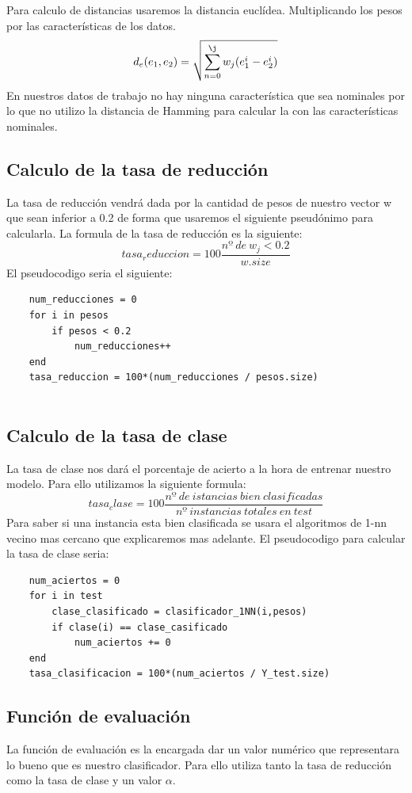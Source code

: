 \documentclass[titlepage]{article}
\begin{document}
	Para calculo de distancias usaremos la distancia euclídea. Multiplicando los pesos por las características de los datos.
	$$
		d_e(e_1,e_2) = \sqrt{\sum_{n=0}^{\j} w_j(e_1^i-e_2^i)}
	$$
	En nuestros datos de trabajo no hay ninguna característica que sea nominales por lo que no utilizo la distancia de Hamming para calcular la con las características nominales. 
	\newpage
	\subsection{Calculo de la tasa de reducción}
	La tasa de reducción vendrá dada por la cantidad de pesos de nuestro vector w que sean inferior a 0.2 de forma que usaremos el siguiente pseudónimo para calcularla.
	La formula de la tasa de reducción es la siguiente:
	$$
		tasa_reduccion = 100 \frac{nº\ de\ w_j < 0.2}{w.size}
	$$
	El pseudocodigo seria el siguiente:
	\begin{lstlisting}
	num_reducciones = 0
	for i in pesos
		if pesos < 0.2
			num_reducciones++
	end
	tasa_reduccion = 100*(num_reducciones / pesos.size)
	
	\end{lstlisting}
	
	\subsection{Calculo de la tasa de clase}
	La tasa de clase nos dará el porcentaje de acierto a la hora de entrenar nuestro modelo. Para ello utilizamos la siguiente formula:
	$$
	tasa_clase = 100 \frac{nº\ de\ istancias\ bien\ clasificadas}{nº\ instancias\ totales\ en\ test}
	$$
	Para saber si una instancia esta bien clasificada se usara el algoritmos de 1-nn vecino mas cercano que explicaremos mas adelante.
	El pseudocodigo para calcular la tasa de clase seria:
	
	\begin{lstlisting}
	num_aciertos = 0
	for i in test
		clase_clasificado = clasificador_1NN(i,pesos)
		if clase(i) == clase_casificado
			num_aciertos += 0
	end
	tasa_clasificacion = 100*(num_aciertos / Y_test.size)
	\end{lstlisting}
	
	\subsection{Función de evaluación}
	La función de evaluación es la encargada dar un valor numérico que representara lo bueno que es nuestro clasificador. Para ello utiliza tanto la tasa de reducción como la tasa de clase y un valor $\alpha$. 
	
\end{document}
